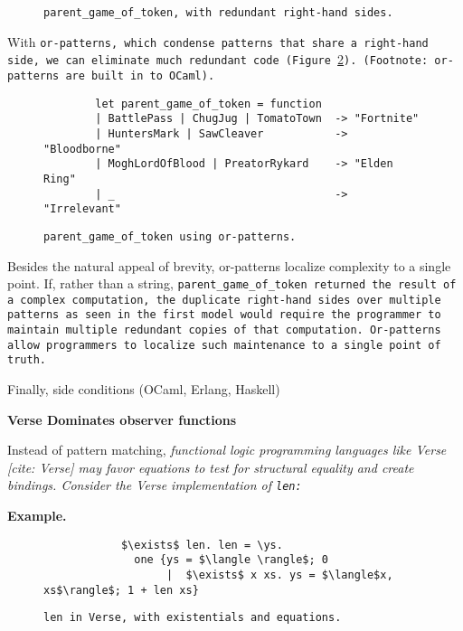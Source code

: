 \documentclass[manuscript,screen,review, 12pt]{acmart}
\begin{document}
\begin{outline}[enumerate]
\begin{figure}
        \caption{\tt{parent\_game\_of\_token}, with redundant right-hand sides.} 
        \label{fig:barepgot}
        \end{figure}

With \tt{or-patterns}, which condense patterns that share a right-hand side, we
can eliminate much redundant code (Figure~\ref{fig:orpgot}). (Footnote:
or-patterns are built in to OCaml). 

    \begin{figure}
    \begin{center}
    \begin{verbatim}
        let parent_game_of_token = function 
        | BattlePass | ChugJug | TomatoTown  -> "Fortnite"
        | HuntersMark | SawCleaver           -> "Bloodborne"
        | MoghLordOfBlood | PreatorRykard    -> "Elden Ring"
        | _                                  -> "Irrelevant"
    \end{verbatim}
    \end{center}    
    \caption{\tt{parent\_game\_of\_token} using or-patterns.} 
    \label{fig:orpgot}
    \end{figure}

    Besides the natural appeal of brevity, or-patterns localize complexity to a
    single point. If, rather than a string, \tt{parent\_game\_of\_token}
    returned the result of a complex computation, the duplicate right-hand sides
    over multiple patterns as seen in the first model would require the
    programmer to maintain multiple redundant copies of that computation.
     Or-patterns allow programmers to
    localize such maintenance to a single point of truth. 

    Finally, side conditions (OCaml, Erlang, Haskell)

    \1 \bf{Verse Dominates observer functions }

    Instead of pattern matching, \it{functional logic programming} languages
    like Verse [cite: Verse] may favor equations to test for structural
    equality and create bindings. Consider the Verse implementation of \tt{len}:

    \2 \bf{Example.}

    \begin{figure}
        \verselst
        \begin{lstlisting}
            $\exists$ len. len = \ys. 
              one {ys = $\langle \rangle$; 0
                   |  $\exists$ x xs. ys = $\langle$x, xs$\rangle$; 1 + len xs}
        \end{lstlisting}
    \caption{\tt{len} in Verse, with existentials and equations.} 
    \label{fig:verselen}
    \end{figure}
    

\end{outline}
\end{document}
